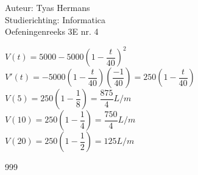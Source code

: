 \documentclass[a4paper]{article}
\begin{document}
  
\noindent \large Auteur: Tyas Hermans \\
\noindent \large Studierichting: Informatica\\
\noindent \large Oefeningenreeks 3E nr. 4\\

\medskip

\normalsize

$V(t) = 5000- 5000\left(1-\dfrac{t}{40}\right)^2$\\

$V'(t) = -5000\left(1-\dfrac{t}{40}\right)\left(\dfrac{-1}{40}\right) = 250\left(1-\dfrac{t}{40}\right)$\\

$V(5) = 250\left(1-\dfrac{1}{8}\right) = \dfrac{875}{4} L/m$\\

$V(10) = 250\left(1-\dfrac{1}{4}\right) = \dfrac{750}{4} L/m$\\

$V(20) = 250\left(1-\dfrac{1}{2}\right) = 125 L/m$\\


\begin{thebibliography}{999}
\end{thebibliography}
\end{document}
